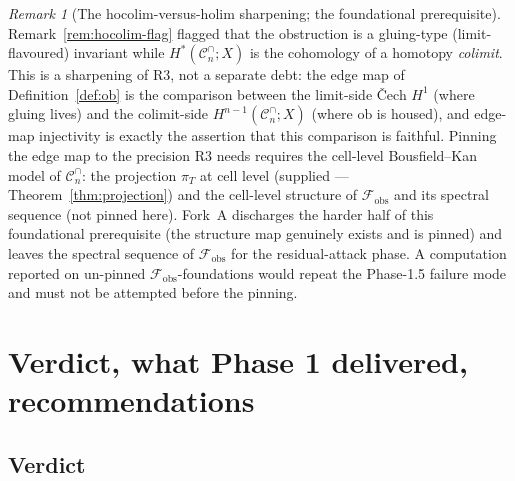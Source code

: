 \documentclass[11pt,oneside]{amsart}
\theoremstyle{plain}
\theoremstyle{definition}
\theoremstyle{remark}
\newtheorem{remark}[theorem]{Remark}
\theoremstyle{honeststyle}
\newcommand{\Cn}{\mathcal{C}^{\cap}_n}
\newcommand{\ob}{\mathrm{ob}}
\newcommand{\fobs}{\mathcal{F}_{\mathrm{obs}}}
\begin{document}
\begin{remark}[The hocolim-versus-holim sharpening; the foundational prerequisite]
\label{rem:holim-prereq}
Remark~\ref{rem:hocolim-flag} flagged that the obstruction is a
gluing-type (limit-flavoured) invariant while $H^{*}(\Cn;X)$ is the
cohomology of a homotopy \emph{colimit}. This is a sharpening of R3,
not a separate debt: the edge map of Definition~\ref{def:ob} is the
comparison between the limit-side \v{C}ech $H^1$ (where gluing lives)
and the colimit-side $H^{n-1}(\Cn;X)$ (where $\ob$ is housed), and
edge-map injectivity is exactly the assertion that this comparison is
faithful. Pinning the edge map to the precision R3 needs requires the
cell-level Bousfield--Kan model of $\Cn$: the projection $\pi_T$ at
cell level (supplied --- Theorem~\ref{thm:projection}) and the
cell-level structure of $\fobs$ and its spectral sequence (not pinned
here). Fork~A discharges the harder half of this foundational
prerequisite (the structure map genuinely exists and is pinned) and
leaves the spectral sequence of $\fobs$ for the residual-attack phase.
A computation reported on un-pinned $\fobs$-foundations would repeat
the Phase-1.5 failure mode and must not be attempted before the
pinning.
\end{remark}

\section{Verdict, what Phase 1 delivered, recommendations}
\label{sec:verdict}

\subsection{Verdict}
\label{ssec:verdict}
\end{document}
